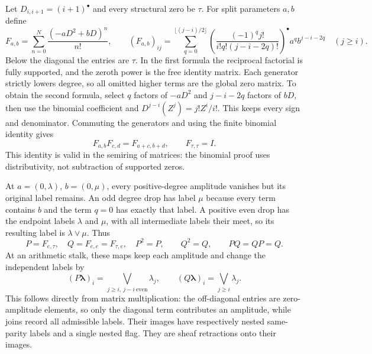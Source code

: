 Let $D_{i,i+1}=(i+1)^\bullet$ and every structural zero be $\tau$.
For split parameters $a,b$ define
\begin{equation}\tag{CLS1}
 F_{a,b}=\sum_{n=0}^{N}\frac{(-aD^2+bD)^n}{n!},\qquad
 (F_{a,b})_{ij}=\sum_{q=0}^{\lfloor (j-i)/2\rfloor}
 \left(\frac{(-1)^qj!}{i!q!(j-i-2q)!}\right)^\bullet
 a^qb^{j-i-2q}\quad(j\ge i).
\end{equation}
Below the diagonal the entries are $\tau$. In the first formula
the reciprocal factorial is fully supported, and the zeroth
power is the free identity matrix. Each generator strictly lowers
degree, so all omitted higher terms are the global zero matrix.
To obtain the second formula, select $q$ factors of $-aD^2$ and
$j-i-2q$ factors of $bD$, then use the binomial coefficient and
$D^{j-i}(Z^j)=j!Z^i/i!$. This keeps every sign and denominator.
Commuting the generators and using the finite binomial identity gives
\begin{equation}\tag{CLS2}
 F_{a,b}F_{c,d}=F_{a+c,b+d},\qquad F_{\tau,\tau}=I.
\end{equation}
This identity is valid in the semiring of matrices: the binomial
proof uses distributivity, not subtraction of supported zeros.

At $a=(0,\lambda)$, $b=(0,\mu)$, every positive-degree amplitude
vanishes but its original label remains. An odd degree drop has
label $\mu$ because every term contains $b$ and the term $q=0$
has exactly that label. A positive even drop has the endpoint
labels $\lambda$ and $\mu$, with all intermediate labels their
meet, so its resulting label is $\lambda\vee\mu$. Thus
\begin{equation}\tag{CLS3}
 P=F_{e,\tau},\quad Q=F_{e,e}=F_{\tau,e},\quad
 P^2=P,\qquad Q^2=Q,\qquad PQ=QP=Q.
\end{equation}
At an arithmetic stalk, these maps keep each amplitude and change
the independent labels by
\begin{equation}\tag{CLS4}
 (P\boldsymbol\lambda)_i=
       \bigvee_{j\ge i,\ j-i\ \mathrm{even}}\lambda_j,
 \qquad (Q\boldsymbol\lambda)_i=\bigvee_{j\ge i}\lambda_j.
\end{equation}
This follows directly from matrix multiplication: the off-diagonal
entries are zero-amplitude elements, so only the diagonal term
contributes an amplitude, while joins record all admissible labels.
Their images have respectively nested same-parity labels and a
single nested flag. They are sheaf retractions onto their images.

